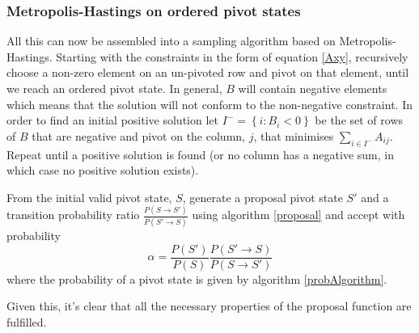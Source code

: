 \documentclass{article}
\begin{document}
\subsubsection{Metropolis-Hastings on ordered pivot states}

All this can now be assembled into a sampling algorithm based on Metropolis-Hastings. Starting with the constraints in the form of equation \ref{Axy}, recursively choose a non-zero element on an un-pivoted row and pivot on that element, until we reach an ordered pivot state. In general, $B$ will contain negative elements which means that the solution will not conform to the non-negative constraint. In order to find an initial positive solution let $I^- = \left\{i: B_i < 0\right\}$ be the set of rows of $B$ that are negative and pivot on the column, $j$, that minimises $\sum_{i\in I^-}A_{ij}$. Repeat until a positive solution is found (or no column has a negative sum, in which case no positive solution exists).

From the initial valid pivot state, $S$, generate a proposal pivot state $S'$ and a transition probability ratio $\frac{P(S\rightarrow S')}{P(S' \rightarrow S)}$ using algorithm \ref{proposal} and accept with probability
\[
\alpha = \frac{P(S')}{P(S)}\frac{P(S'\rightarrow S)}{P(S \rightarrow S')}
\]
where the probability of a pivot state is given by algorithm \ref{probAlgorithm}.

Given this, it's clear that all the necessary properties of the proposal function are fulfilled.

%
% 


\end{document}

